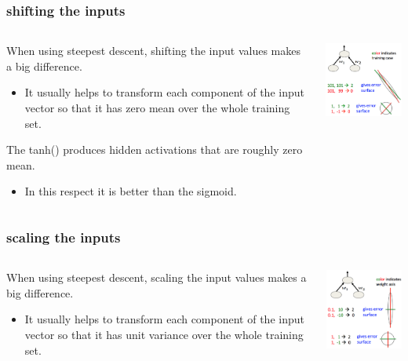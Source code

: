 \documentclass[USenglish,pdftex,compress,10pt,svgnamesi,handout]{beamer}
\begin{document}
\begin{frame}
\frametitle{shifting the inputs}
\begin{columns}
\begin{column}{6cm}
When using steepest descent, shifting the input values makes a big difference.
\begin{itemize}
\item It usually helps to transform each component of the input vector so that it has zero mean over the whole training set.
\end{itemize}

The tanh() produces hidden activations that are roughly zero mean.
\begin{itemize}
\item In this respect it is better than the sigmoid.
\end{itemize}
\end{column}
\begin{column}{5cm}
\includegraphics[width=5cm]{pics/2-inputshift.png}
\end{column}
\end{columns}
\end{frame}


\begin{frame}
\frametitle{scaling the inputs}
\begin{columns}
\begin{column}{6cm}
When using steepest descent, scaling the input values makes a big difference.
\begin{itemize}
\item It usually helps to transform each component of the input vector so that it has unit variance over the whole training set.
\end{itemize}
\end{column}
\begin{column}{5cm}
\includegraphics[width=5cm]{pics/2-inputscale.png}
\end{column}
\end{columns}
\end{frame}
\end{document}
